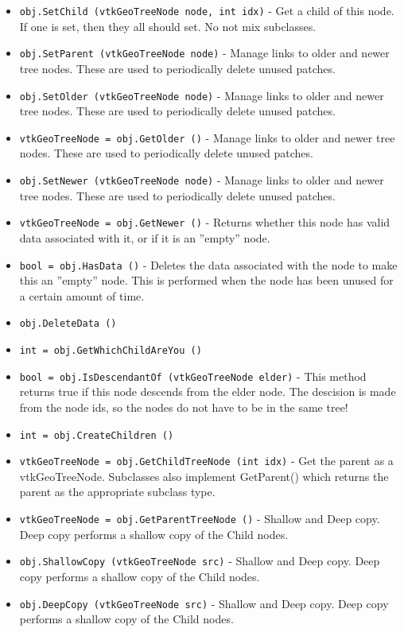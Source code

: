 \begin{itemize}
\item  \verb|obj.SetChild (vtkGeoTreeNode node, int idx)| -  Get a child of this node. If one is set, then they all should
 set.  No not mix subclasses.

\item  \verb|obj.SetParent (vtkGeoTreeNode node)| -  Manage links to older and newer tree nodes.
 These are used to periodically delete unused patches.

\item  \verb|obj.SetOlder (vtkGeoTreeNode node)| -  Manage links to older and newer tree nodes.
 These are used to periodically delete unused patches.

\item  \verb|vtkGeoTreeNode = obj.GetOlder ()| -  Manage links to older and newer tree nodes.
 These are used to periodically delete unused patches.

\item  \verb|obj.SetNewer (vtkGeoTreeNode node)| -  Manage links to older and newer tree nodes.
 These are used to periodically delete unused patches.

\item  \verb|vtkGeoTreeNode = obj.GetNewer ()| -  Returns whether this node has valid data associated
 with it, or if it is an ''empty'' node.

\item  \verb|bool = obj.HasData ()| -  Deletes the data associated with the node to make this
 an ''empty'' node. This is performed when the node has
 been unused for a certain amount of time.

\item  \verb|obj.DeleteData ()|

\item  \verb|int = obj.GetWhichChildAreYou ()|

\item  \verb|bool = obj.IsDescendantOf (vtkGeoTreeNode elder)| -  This method returns true if this node descends from the
 elder node.  The descision is made from the node ids, so the nodes do
 not have to be in the same tree!

\item  \verb|int = obj.CreateChildren ()|

\item  \verb|vtkGeoTreeNode = obj.GetChildTreeNode (int idx)| -  Get the parent as a vtkGeoTreeNode.
 Subclasses also implement GetParent() which returns the parent
 as the appropriate subclass type.

\item  \verb|vtkGeoTreeNode = obj.GetParentTreeNode ()| -  Shallow and Deep copy. Deep copy performs a shallow copy
 of the Child nodes.

\item  \verb|obj.ShallowCopy (vtkGeoTreeNode src)| -  Shallow and Deep copy. Deep copy performs a shallow copy
 of the Child nodes.

\item  \verb|obj.DeepCopy (vtkGeoTreeNode src)| -  Shallow and Deep copy. Deep copy performs a shallow copy
 of the Child nodes.

\end{itemize}
